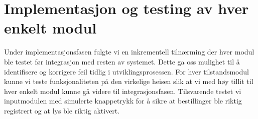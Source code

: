 \section{Implementasjon og testing av hver enkelt modul}
Under implementasjonsfasen fulgte vi en inkrementell tilnærming der hver modul ble testet før integrasjon med resten av systemet. Dette ga oss mulighet til å identifisere og korrigere feil tidlig i utviklingsprosessen. For hver tilstandsmodul kunne vi teste funksjonaliteten på den virkelige heisen slik at vi med høy tillit til hver enkelt modul kunne gå videre til integrasjonsfasen. Tilsvarende testet vi inputmodulen med simulerte knappetrykk for å sikre at bestillinger ble riktig registrert og at lys ble riktig aktivert.

